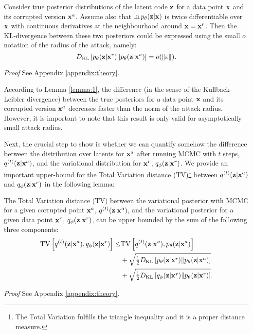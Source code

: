 \begin{lemma}\label{lemma:1}
Consider true posterior distributions of the latent code ${\mathbf{z}}$ for a data point ${\mathbf{x}}$ and its corrupted version ${\mathbf{x}}^a$.  
Assume also that $\ln p_{\theta}({\mathbf{z}}|{\mathbf{x}})$ is twice differentiable  over ${\mathbf{x}}$ with continuous derivatives at the neighbourhood around ${\mathbf{x}}={\mathbf{x}}^r$. 
Then the KL-divergence between these two posteriors could be expressed using the small $o$ notation of the radius of the attack, namely:
\begin{equation}
     D_{\mathrm{KL}}\left[ p_{\theta}({\mathbf{z}}|{\mathbf{x}}^r)\|p_{\theta}({\mathbf{z}}|{\mathbf{x}}^a)\right] = o(\|\varepsilon\|).
\end{equation}
\end{lemma}
\textit{Proof} See Appendix \ref{appendix:theory}.

According to Lemma \ref{lemma:1}, the difference (in the sense of the Kullback-Leibler divergence) between the true posteriors for a data point ${\mathbf{x}}$ and its corrupted version ${\mathbf{x}}^{a}$ decreases faster than the norm of the attack radius. However, it is important to note that this result is only valid for asymptotically small attack radius.

Next, the crucial step to show is whether we can quantify somehow the difference between the distribution over latents for ${\mathbf{x}}^a$ after running MCMC with $t$ steps, $q^{(t)}({\mathbf{z}}|{\mathbf{x}}^a)$, and the variational distribution for ${\mathbf{x}}^r$, $q_{\phi}({\mathbf{z}}|{\mathbf{x}}^r)$. 
We provide an important upper-bound for the Total Variation distance (TV)\footnote{The Total Variation fulfills the triangle inequality and it is a proper distance measure.} between $q^{(t)}({\mathbf{z}}|{\mathbf{x}}^a)$ and $q_{\phi}({\mathbf{z}}|{\mathbf{x}}^r)$ in the following lemma:

\begin{lemma}\label{lemma:2}
The Total Variation distance ($\mathrm{TV}$) between the variational posterior with MCMC for a given corrupted point ${\mathbf{x}}^a$, $q^{(t)}({\mathbf{z}}|{\mathbf{x}}^a)$, and the variational posterior for a given data point ${\mathbf{x}}^r$, $q_{\phi}({\mathbf{z}}|{\mathbf{x}}^r)$, can be upper bounded by the sum of the following three components:
\begin{align}
{\mathrm{TV}\left[q^{(t)}({\mathbf{z}}|{\mathbf{x}}^a) ,q_{\phi}({\mathbf{z}}|{\mathbf{x}}^r) \right]}
\leq &
    {\mathrm{TV}\left[q^{(t)}({\mathbf{z}}|{\mathbf{x}}^a) ,p_{\theta}({\mathbf{z}}|{\mathbf{x}}^a) \right]} \notag\\
    &+ 
    \sqrt{\tfrac12 D_{\mathrm{KL}}\left[ p_{\theta}({\mathbf{z}}|{\mathbf{x}}^r)\|p_{\theta}({\mathbf{z}}|{\mathbf{x}}^a)\right] } \notag\\
    &+
   \sqrt{\tfrac12  D_{\mathrm{KL}}\left[q_{\phi}({\mathbf{z}}|{\mathbf{x}}^r)\|p_{\theta}({\mathbf{z}}|{\mathbf{x}}^r)\right] }.
\end{align}
\end{lemma}
\textit{Proof} See Appendix \ref{appendix:theory}.

